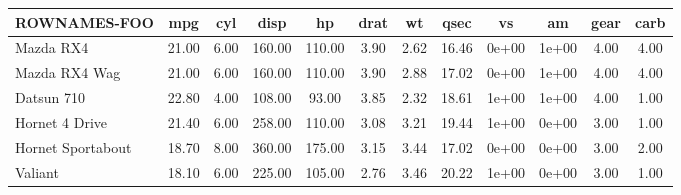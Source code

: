 \begin{tabular}{lccccccccccc}
\hline
\textbf{ROWNAMES-FOO} & \textbf{mpg} & \textbf{cyl} & \textbf{disp} & \textbf{hp} & \textbf{drat} & \textbf{wt} & \textbf{qsec} & \textbf{vs} & \textbf{am} & \textbf{gear} & \textbf{carb} \\
\hline
Mazda RX4 & 21.00 & 6.00 & 160.00 & 110.00 & 3.90 & 2.62 & 16.46 & 0e+00 & 1e+00 & 4.00 & 4.00\\
Mazda RX4 Wag & 21.00 & 6.00 & 160.00 & 110.00 & 3.90 & 2.88 & 17.02 & 0e+00 & 1e+00 & 4.00 & 4.00\\
Datsun 710 & 22.80 & 4.00 & 108.00 &  93.00 & 3.85 & 2.32 & 18.61 & 1e+00 & 1e+00 & 4.00 & 1.00\\
Hornet 4 Drive & 21.40 & 6.00 & 258.00 & 110.00 & 3.08 & 3.21 & 19.44 & 1e+00 & 0e+00 & 3.00 & 1.00\\
Hornet Sportabout & 18.70 & 8.00 & 360.00 & 175.00 & 3.15 & 3.44 & 17.02 & 0e+00 & 0e+00 & 3.00 & 2.00\\
Valiant & 18.10 & 6.00 & 225.00 & 105.00 & 2.76 & 3.46 & 20.22 & 1e+00 & 0e+00 & 3.00 & 1.00\\
\hline
\end{tabular}
